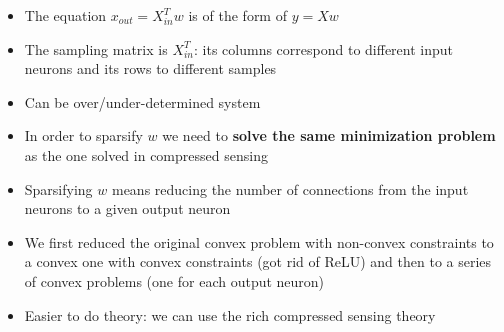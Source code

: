 \begin{itemize}
\begin{figure}[H]
	\end{figure}	
	\item The equation $x_{out} = X_{in}^Tw$ is of the form of $y = Xw$
	\item The sampling matrix is $X_{in}^T$: its columns correspond to different input neurons and its rows to different samples
	\item Can be over/under-determined system
	\item In order to sparsify $w$ we need to \textbf{solve the same minimization problem} as the one solved in compressed sensing
	\item Sparsifying $w$ means reducing the number of connections from the input neurons to a given output neuron
	\item We first reduced the original convex problem with non-convex constraints to a convex one with convex constraints (got rid of ReLU) and then to a series of convex problems (one for each output neuron)
	\item Easier to do theory: we can use the rich compressed sensing theory 
\end{itemize}

